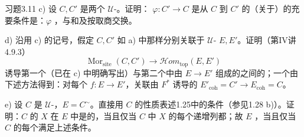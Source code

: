 \begin{SGAresult}{习题}{3.11}
c) 设 $C,C'$ 是两个 $\mathcal U$-。证明： $\varphi:C'\to C$ 是从 $C$ 到 $C'$ 的（关于）的充要条件是：$\varphi$ ，与和及按取商交换。

d) 沿用 c) 的记号，假定 $C,C'$ 如 a) 中那样分别关联于 $\mathcal U$- $E,E'$。证明（第IV讲4.9.3）
\[
\operatorname{Mor}_{\mathrm{site}}(C,C')\longrightarrow
\mathscr{H}\!om_{\mathrm{top}}(E,E')
\]
诱导第一个（已在 c) 中明确写出）与第二个中由 $E\to E'$ 组成的之间的；一个由下述方法得到：对每个 $f:E\to E'$，关联由 $F^*$ 诱导的 $E'_{\mathrm{coh}}=C'\to E_{\mathrm{coh}}=C$。

e) 设 $C$ 是 $\mathcal U$-，$E=C^{\sim}$。直接用 $C$ 的性质表述1.25中的条件（参见1.28 b)）。证明：$C$ 的 $X$ 在 $E$ 中是的，当且仅当 $C$ 中 $X$ 的每个递增列都；故 $E$ ，当且仅当 $C$ 的每个满足上述条件。
\end{SGAresult}

